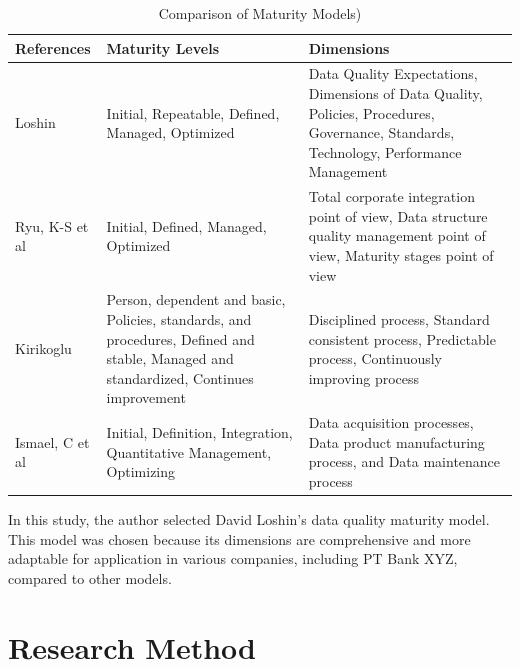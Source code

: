 \documentclass[conference]{IEEEtran}
\begin{document}
\begin{table}[H]
\caption{Comparison of Maturity Models)}
\label{tab:comparison-dqm-part1}
\centering
\begin{tabular}{|p{1.5cm}|p{3cm}|p{3cm}|}
\hline
\textbf{References} & \textbf{Maturity Levels} & \textbf{Dimensions} \\ \hline
Loshin \cite{loshin_dqi} & Initial, Repeatable, Defined, Managed, Optimized & Data Quality Expectations, Dimensions of Data Quality, Policies, Procedures, Governance, Standards, Technology, Performance Management \\ \hline
Ryu, K-S et al \cite{ryu2006dqm} & Initial, Defined, Managed, Optimized & Total corporate integration point of view, Data structure quality management point of view, Maturity stages point of view \\ \hline
Kirikoglu \cite{kirikoglu2017dqm} & Person, dependent and basic, Policies, standards, and procedures, Defined and stable, Managed and standardized, Continues improvement & Disciplined process, Standard consistent process, Predictable process, Continuously improving process \\ \hline
Ismael, C et al \cite{ismael2003caldea} & Initial, Definition, Integration, Quantitative Management, Optimizing & Data acquisition processes, Data product manufacturing process, and Data maintenance process \\ \hline
\end{tabular}
\end{table}



In this study, the author selected David Loshin's data quality maturity model. This model was chosen because its dimensions are comprehensive and more adaptable for application in various companies, including PT Bank XYZ, compared to other models.

\section{Research Method}
\end{document}
